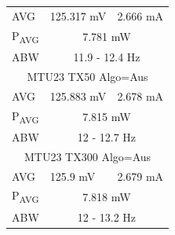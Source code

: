 \begin{figure}[!hbtp]
\begin{minipage}{0.5\textwidth}
\begin{tabular}{|l|l|l|}
      AVG & 125.317 mV & 2.666 mA\\
      P\textsubscript{AVG} & \multicolumn{2}{c|}{7.781 mW}\\
      ABW & \multicolumn{2}{c|}{11.9 - 12.4 Hz}\\
      \hline
      \multicolumn{3}{|c|}{MTU23 TX50 Algo=Aus}\\
      AVG & 125.883 mV & 2.678 mA\\
      P\textsubscript{AVG} & \multicolumn{2}{c|}{7.815 mW}\\
      ABW & \multicolumn{2}{c|}{12 - 12.7 Hz}\\
      \hline
      \multicolumn{3}{|c|}{MTU23 TX300 Algo=Aus}\\
      AVG & 125.9 mV & 2.679 mA\\
      P\textsubscript{AVG} & \multicolumn{2}{c|}{7.818 mW}\\
      ABW & \multicolumn{2}{c|}{12 - 13.2 Hz}\\
      \hline
    \end{tabular}
    \label{tab:test2}
  \end{minipage}
\end{figure}

